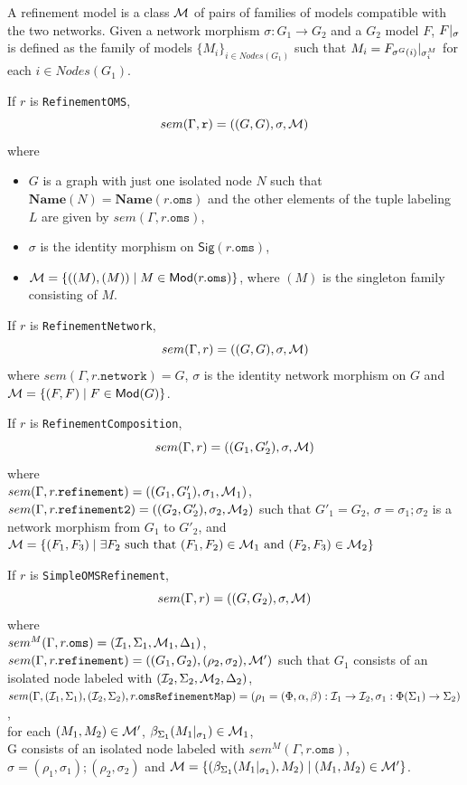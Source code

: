 \documentclass[10pt,fleqn,final]{scrreprt}
\newcommand*{\syntax}[1]{\texttt{#1}}
\newcommand{\Sig}{\mathsf{Sig}}
\newcommand{\Name}{\ensuremath{\mathbf{Name}}}
\newenvironment{definitions}[0]{\medskip }{}
\begin{document}
\begin{definitions}
A refinement model is a class ${\cal M}$ 
of pairs of families of models compatible with the two networks. 
Given a network morphism $\sigma:G_1\to G_2$ and a $G_2$ model $F$, 
 $F|_{\sigma}$ is defined as the family of models 
$\{M_i\}_{i\in Nodes(G_1)}$ such that
$M_i = F_{\sigma^G(i)}|_{\sigma^M_{i}}$ for each $i\in Nodes(G_1)$.
\medskip

If $r$ is \syntax{RefinementOMS},
$$sem(\Gamma, \syntax{r}) = 
   ((G, G), \sigma, \cM) $$
  \noindent where 
  \begin{itemize}
  \item $G$ is a graph with just one isolated node $N$
  such that $\Name(N) = \Name(r.\syntax{oms})$
  and the other elements of the tuple labeling
  $L$ are given by $sem(\Gamma,r.\syntax{oms})$,
  \item $\sigma$ is the identity morphism on 
  $\Sig(r.\syntax{oms})$,  
  \item $\cM = \{((M), (M)) \mid M \in \Mod(r.\syntax{oms})\}$,
   where $(M)$ is the singleton family consisting of $M$.
  \end{itemize}

If $r$ is \syntax{RefinementNetwork},
$$sem(\Gamma, r) = ((G, G), \sigma, {\cal M})$$
\noindent 
where $sem(\Gamma, r.\syntax{network}) = G$,
$\sigma$ is the identity network morphism on $G$
and 
${\cal M} = \{ (F, F) \mid F \in \mathsf{Mod}(G)\}$.

If $r$ is \syntax{RefinementComposition},
$$sem(\Gamma, r) = 
((G_1, G'_2), \sigma, {\cal M})$$
\noindent where\\ 
$sem(\Gamma, r.\syntax{refinement}) = 
((G_1, G'_1), \sigma_1, \cM_1)$,
$sem(\Gamma, r.\syntax{refinement2}) = 
((G_2, G'_2), \sigma_2, \cM_2)$
such that $G'_1 = G_2$,
$\sigma = \sigma_1;\sigma_2$
is a network morphism from $G_1$ to $G'_2$, 
and
${\cal M} = \{(F_1, F_3) \mid \exists F_2 \text{ such that } 
(F_1, F_2) \in {\cal M}_1  \text{ and }
(F_2, F_3) \in {\cal M}_2  \}$

If $r$ is \syntax{SimpleOMSRefinement},
$$sem(\Gamma, r) = 
((G, G_2), \sigma, {\cal M})$$
where\\
 $sem^M(\Gamma,  r.\syntax{oms}) = (\cI_1,\Sigma_1, \cM_1, \Delta_1)$,\\
 $sem(\Gamma,  r.\syntax{refinement}) = 
 ((G_1, G_2), (\rho_2,\sigma_2), \cM')$ 
 such that $G_1$ consists of an isolated node labeled with 
 $({\cal I}_2, \Sigma_2, {\cal M}_2, \Delta_2)$,\\
 $sem(\Gamma,  (\cI_1,\Sigma_1), (\cI_2,\Sigma_2), r.\syntax{omsRefinementMap}) = (\rho_1 = (\Phi, \alpha,\beta):\cI_1\to\cI_2, \sigma_1:\Phi(\Sigma_1)\to\Sigma_2)$,\\
 for each $(M_1, M_2) \in {\cal M}'$,
$\beta_{\Sigma_1}(M_1|_{\sigma_1}) \in {\cal M}_1$,\\
G consists of an isolated node labeled with $sem^M(\Gamma,  r.\syntax{oms})$,\\
$\sigma = (\rho_1,\sigma_1);(\rho_2,\sigma_2)$ and
${\cal M} = \{ (\beta_{\Sigma_1}(M_1|_{\sigma_1}), M_2) \mid
(M_1, M_2) \in {\cal M}' \}$.


\end{definitions}
\end{document}
